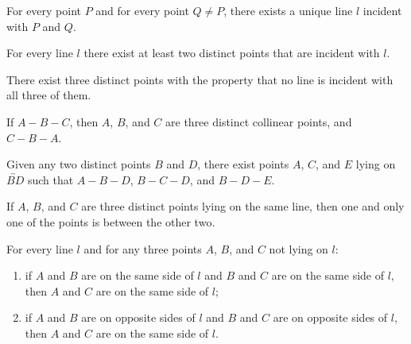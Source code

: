 \documentclass[11pt]{amsart}
\theoremstyle{definition}
\theoremstyle{remark}
\begin{document}
\begin{enumerate}[label=\textrm{[}\textbf{I}\arabic*\textrm{]}]
  \item\label{I1} For every point $P$ and for every point $Q\neq P$, there exists a unique line $l$ incident with $P$ and $Q$.
  \item\label{I2} For every line $l$ there exist at least two distinct points that are incident with $l$.
  \item\label{I3} There exist three distinct points with the property that no line is incident with all three of them.
\end{enumerate}
\begin{enumerate}[label=\textrm{[}\textbf{O}\arabic*\textrm{]}]
  \item\label{O1} If $A-B-C$, then $A$, $B$, and $C$ are three distinct collinear points, and $C-B-A$.
  \item\label{O2} Given any two distinct points $B$ and $D$, there exist points $A$, $C$, and $E$ lying on $\overleftrightarrow{BD}$ such that $A-B-D$, $B-C-D$, and $B-D-E$.
  \item\label{O3} If $A$, $B$, and $C$ are three distinct points lying on the same line, then one and only one of the points is between the other two.
  \item\label{O4} For every line $l$ and for any three points $A$, $B$, and $C$ not lying on $l$:
  \begin{enumerate}[label=(\roman*)]
    \item if $A$ and $B$ are on the same side of $l$ and $B$ and $C$ are on the same side of $l$, then $A$ and $C$ are on the same side of $l$;
    \item if $A$ and $B$ are on opposite sides of $l$ and $B$ and $C$ are on opposite sides of $l$, then $A$ and $C$ are on the same side of $l$.
  \end{enumerate}
\end{enumerate}
\end{document}
